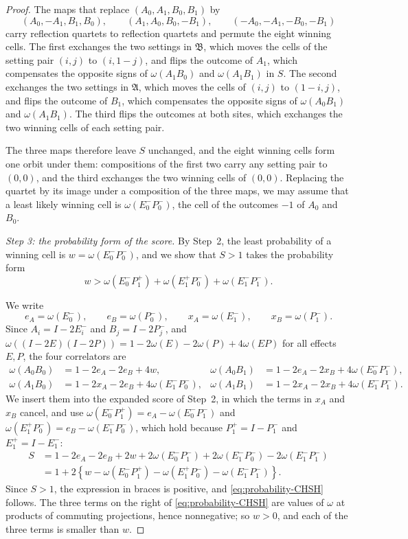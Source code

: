 \documentclass[11pt]{amsart}
\numberwithin{equation}{section}
\theoremstyle{definition}
\newcommand{\A}{\mathfrak A}
\newcommand{\B}{\mathfrak B}
\begin{document}
\begin{proof}
The maps that replace \((A_0,A_1,B_0,B_1)\) by
\[
 (A_0,-A_1,B_1,B_0),\qquad
 (A_1,A_0,B_0,-B_1),\qquad
 (-A_0,-A_1,-B_0,-B_1)
\]
carry reflection quartets to reflection quartets and permute the eight
winning cells. The first exchanges the two settings in \(\B\), which
moves the cells of the setting pair \((i,j)\) to \((i,1-j)\), and flips
the outcome of \(A_1\), which compensates the opposite signs of
\(\omega(A_1B_0)\) and \(\omega(A_1B_1)\) in \(S\). The second exchanges
the two settings in \(\A\), which moves the cells of \((i,j)\) to
\((1-i,j)\), and flips the outcome of \(B_1\), which compensates the
opposite signs of \(\omega(A_0B_1)\) and \(\omega(A_1B_1)\). The third
flips the outcomes at both sites, which exchanges the two winning cells
of each setting pair.

The three maps therefore leave \(S\) unchanged, and the eight winning
cells form one orbit under them: compositions of the first two carry
any setting pair to \((0,0)\), and the third exchanges the two winning
cells of \((0,0)\). Replacing the quartet by its image under a
composition of the three maps, we may assume that a least likely
winning cell is \(\omega(E_0^-P_0^-)\), the cell of the outcomes \(-1\)
of \(A_0\) and \(B_0\).

\smallskip
\emph{Step 3: the probability form of the score.} By Step~2, the least
probability of a winning cell is \(w=\omega(E_0^-P_0^-)\), and we show
that \(S>1\) takes the probability form
\begin{equation}
 w>
 \omega(E_0^-P_1^+)
 +\omega(E_1^+P_0^-)
 +\omega(E_1^-P_1^-).
 \label{eq:probability-CHSH}
\end{equation}

We write
\[
 e_A=\omega(E_0^-),\qquad e_B=\omega(P_0^-),\qquad
 x_A=\omega(E_1^-),\qquad x_B=\omega(P_1^-).
\]
Since \(A_i=I-2E_i^-\) and \(B_j=I-2P_j^-\), and
\(\omega((I-2E)(I-2P))=1-2\omega(E)-2\omega(P)+4\omega(EP)\) for all
effects \(E,P\), the four correlators are
\begin{align*}
 \omega(A_0B_0)&=1-2e_A-2e_B+4w, &
 \omega(A_0B_1)&=1-2e_A-2x_B+4\omega(E_0^-P_1^-),\\
 \omega(A_1B_0)&=1-2x_A-2e_B+4\omega(E_1^-P_0^-), &
 \omega(A_1B_1)&=1-2x_A-2x_B+4\omega(E_1^-P_1^-).
\end{align*}
We insert them into the expanded score of Step~2, in which the terms in
\(x_A\) and \(x_B\) cancel, and use
\(\omega(E_0^-P_1^+)=e_A-\omega(E_0^-P_1^-)\) and
\(\omega(E_1^+P_0^-)=e_B-\omega(E_1^-P_0^-)\), which hold because
\(P_1^+=I-P_1^-\) and \(E_1^+=I-E_1^-\):
\begin{align*}
 S&=1-2e_A-2e_B+2w+2\omega(E_0^-P_1^-)+2\omega(E_1^-P_0^-)
  -2\omega(E_1^-P_1^-)\\
 &=1+2\left\{
 w-\omega(E_0^-P_1^+)
  -\omega(E_1^+P_0^-)-\omega(E_1^-P_1^-)\right\}.
\end{align*}
Since \(S>1\), the expression in braces is positive, and
\eqref{eq:probability-CHSH} follows. The three terms
on the right of \eqref{eq:probability-CHSH} are values of \(\omega\) at
products of commuting projections, hence nonnegative; so \(w>0\), and
each of the three terms is smaller than \(w\).


\end{proof}
\end{document}
